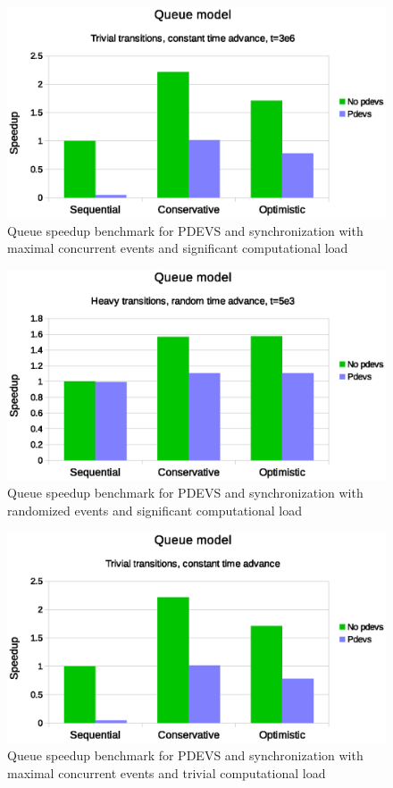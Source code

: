 \begin{figure}
	\center
	\includegraphics[width=\columnwidth]{fig/pdevs_fixed_sleep.eps}
	\caption{Queue speedup benchmark for PDEVS and synchronization with maximal concurrent events and significant computational load}
	\label{fig:pdevs_plot_fixed_sleep}
\end{figure}

\begin{figure}
	\center
	\includegraphics[width=\columnwidth]{fig/pdevs_random_sleep.eps}
	\caption{Queue speedup benchmark for PDEVS and synchronization with randomized events and significant computational load}
	\label{fig:pdevs_plot_random_sleep}
\end{figure}

\begin{figure}
	\center
	\includegraphics[width=\columnwidth]{fig/pdevs_no_sleep.eps}
	\caption{Queue speedup benchmark for PDEVS and synchronization with maximal concurrent events and trivial computational load}
	\label{fig:pdevs_plot_no_sleep}
\end{figure} 